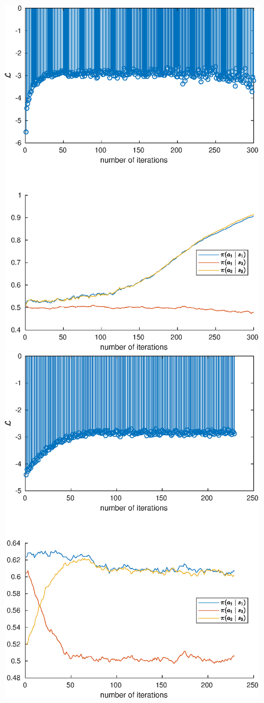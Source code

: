 \documentclass{mpaper}
\begin{document}
\begin{figure}
  \centering
  \begin{minipage}{.5\textwidth}
    \centering
    \includegraphics[width=0.8\columnwidth]{convergence1}
  \end{minipage}%
  \begin{minipage}{.5\textwidth}
    \centering
    \includegraphics[width=0.8\columnwidth]{convergence2}

\end{minipage}
\end{figure}
\end{document}
